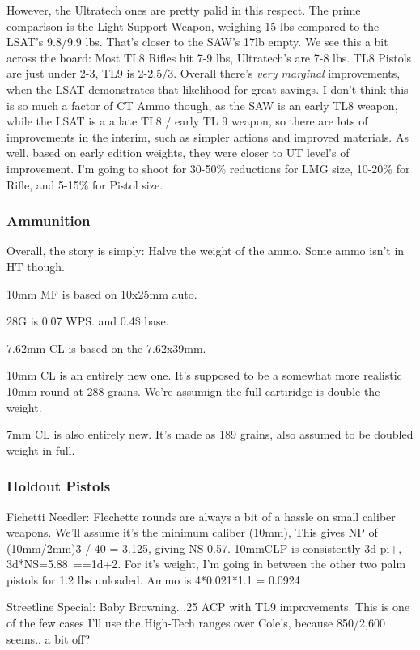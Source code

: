 \begin{multicols*}{2}
	 However, the Ultratech ones are pretty palid in this respect. The prime comparison is the Light Support Weapon, weighing 15 lbs compared to the LSAT's 9.8/9.9 lbs. That's closer to the SAW's 17lb empty. We see this a bit across the board: Most TL8 Rifles hit 7-9 lbs, Ultratech's are 7-8 lbs. TL8 Pistols are just under 2-3, TL9 is 2-2.5/3. Overall there's \textit{very marginal} improvements, when the LSAT demonstrates that likelihood for great savings. I don't think this is so much a factor of CT Ammo though,  as the SAW is an early TL8 weapon, while the LSAT is a a late TL8 / early TL 9 weapon, so there are lots of improvements in the interim, such as simpler actions and improved materials. As well, based on early edition weights, they were closer to UT level's of improvement.  I'm going to shoot for 30-50\% reductions for LMG size, 10-20\% for Rifle, and 5-15\% for Pistol size.
	 
	 \subsubsection{Ammunition}
	 Overall, the story is simply: Halve the weight of the ammo. Some ammo isn't in HT though. 
	 
	 10mm MF is based on 10x25mm auto.
	 
	 28G is 0.07  WPS. and 0.4\$ base.
	 
	 7.62mm CL is based on the 7.62x39mm.
	 
	 10mm CL is an entirely new one. It's supposed to be a somewhat more realistic 10mm round at 288 grains. We're assumign the full cartiridge is double the weight.
	 
	 7mm CL is also entirely new. It's made as 189 grains, also assumed to be doubled weight in full.
	
	\subsubsection{Holdout Pistols}
	
	Fichetti Needler: Flechette rounds are always a bit of a hassle on small caliber weapons. We'll assume it's the minimum caliber (10mm), This gives NP of (10mm/2mm)\^3 / 40 = 3.125, giving NS 0.57. 10mmCLP is consistently 3d pi+, 3d*NS=5.88~==1d+2. For it's weight, I'm going in between the other two palm pistols for 1.2 lbs unloaded. Ammo is 4*0.021*1.1 = 0.0924
	
	Streetline Special: Baby Browning. .25 ACP with TL9 improvements. This is one of the few cases I'll use the High-Tech ranges over Cole's, because 850/2,600 seems.. a bit off?
	

\end{multicols*}
